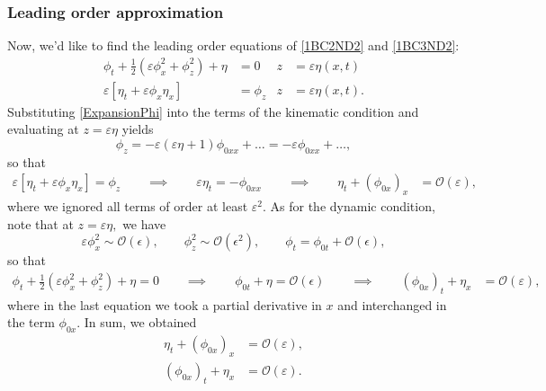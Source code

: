 \documentclass[10pt,reqno,oneside,a4paper]{article}
\begin{document}
\subsubsection*{Leading order approximation}
Now, we'd like to find the leading order equations of \eqref{1BC2ND2} and \eqref{1BC3ND2}:
\begin{align*}
\phi_{t} + \frac{1}{2} \left(\varepsilon\phi_{x}^2 + \phi_{z}^2\right) + \eta &= 0 &z &= \varepsilon\eta(x,t)\\
\varepsilon\left[\eta_{t} + \varepsilon \phi_{x} \eta_{x}\right] &= \phi_{z} &z &= \varepsilon\eta(x,t).
\end{align*}
Substituting \eqref{ExpansionPhi} into the terms of the kinematic condition and evaluating at $z = \varepsilon \eta$ yields 
\[
\phi_z  = -\varepsilon(\varepsilon \eta + 1) \phi_{0xx} + \ldots = -\varepsilon \phi_{0xx} + \ldots,
\]
so that 
\begin{align*}
\varepsilon\left[\eta_{t} + \varepsilon \phi_{x} \eta_{x}\right] = \phi_{z} \qquad \implies \qquad \varepsilon \eta_{t} = -\phi_{0xx} \qquad \implies \qquad  \eta_{t}  +  (\phi_{0x})_x &= \mathcal{O}(\varepsilon),
\end{align*}
where we ignored all terms of order at least $\varepsilon^2.$ As for the dynamic condition, note that at $z = \varepsilon \eta,$ we have 
\[ \varepsilon\phi_x^2  \sim \mathcal{O}(\epsilon), \qquad \phi_z^2 \sim \mathcal{O}(\epsilon^2), \qquad \phi_t = \phi_{0t} + \mathcal{O}(\epsilon),\]
so that 
\begin{align*}
\phi_{t} + \frac{1}{2} \left(\varepsilon\phi_{x}^2 + \phi_{z}^2\right) + \eta = 0 \qquad \implies \qquad \phi_{0t} + \eta = \mathcal{O}(\epsilon) \qquad \implies \qquad (\phi_{0x})_t + \eta_x &= \mathcal{O}(\varepsilon),
\end{align*}
where in the last equation we took a partial derivative in $x$ and interchanged in the term $\phi_{0x}.$ In sum, we obtained
\begin{subequations} \label{1stOrdP}
\begin{align}
\eta_{t}  +  (\phi_{0x})_x &= \mathcal{O}(\varepsilon), \\
(\phi_{0x})_t + \eta_x &= \mathcal{O}(\varepsilon).
\end{align}
\end{subequations}
\end{document}
